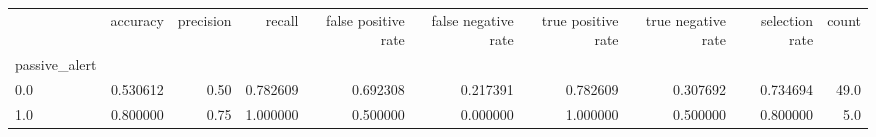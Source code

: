 \begin{tabular}{lrrrrrrrrr}
\toprule
{} &  accuracy &  precision &    recall &  false positive rate &  false negative rate &  true positive rate &  true negative rate &  selection rate &  count \\
passive\_alert &           &            &           &                      &                      &                     &                     &                 &        \\
\midrule
0.0           &  0.530612 &       0.50 &  0.782609 &             0.692308 &             0.217391 &            0.782609 &            0.307692 &        0.734694 &   49.0 \\
1.0           &  0.800000 &       0.75 &  1.000000 &             0.500000 &             0.000000 &            1.000000 &            0.500000 &        0.800000 &    5.0 \\
\bottomrule
\end{tabular}

